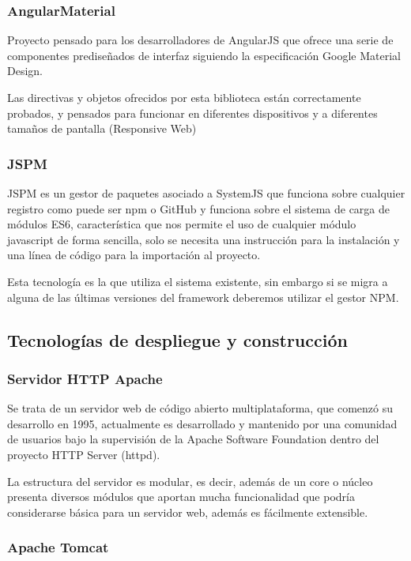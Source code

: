 \subsubsection{AngularMaterial}

Proyecto pensado para los desarrolladores de AngularJS que ofrece una serie de componentes prediseñados de interfaz siguiendo la especificación Google Material Design.

Las directivas y objetos ofrecidos por esta biblioteca están correctamente probados, y pensados para funcionar en diferentes dispositivos y a diferentes tamaños de pantalla (Responsive Web)

\subsubsection{JSPM}

JSPM es un gestor de paquetes asociado a SystemJS que funciona sobre cualquier registro como puede ser npm o GitHub y funciona sobre el sistema de carga de módulos ES6, característica que nos permite el uso de cualquier módulo javascript de forma sencilla, solo se necesita una instrucción para la instalación y una línea de código para la importación al proyecto.

Esta tecnología es la que utiliza el sistema existente, sin embargo si se migra a alguna de las últimas versiones del framework deberemos utilizar el gestor NPM.

\subsection{Tecnologías de despliegue y construcción}

\subsubsection{Servidor HTTP Apache}

Se trata de un servidor web de código abierto multiplataforma, que comenzó su desarrollo en 1995, actualmente es desarrollado y mantenido por una comunidad de usuarios bajo la supervisión de la Apache Software Foundation dentro del proyecto HTTP Server (httpd).

La estructura del servidor es modular, es decir, además de un core o núcleo presenta diversos módulos que aportan mucha funcionalidad que podría considerarse básica para un servidor web, además es fácilmente extensible.

\subsubsection{Apache Tomcat}


